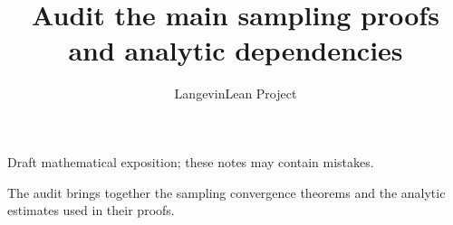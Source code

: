\documentclass[11pt,a4paper]{article}
\title{\texorpdfstring{Audit the main sampling proofs and analytic dependencies}{Audit the main sampling proofs and analytic dependencies}}
\author{LangevinLean Project}
\date{}
\begin{document}
\maketitle
Draft mathematical exposition; these notes may contain mistakes.


The audit brings together the sampling convergence theorems and the analytic estimates used in their proofs.
\end{document}
